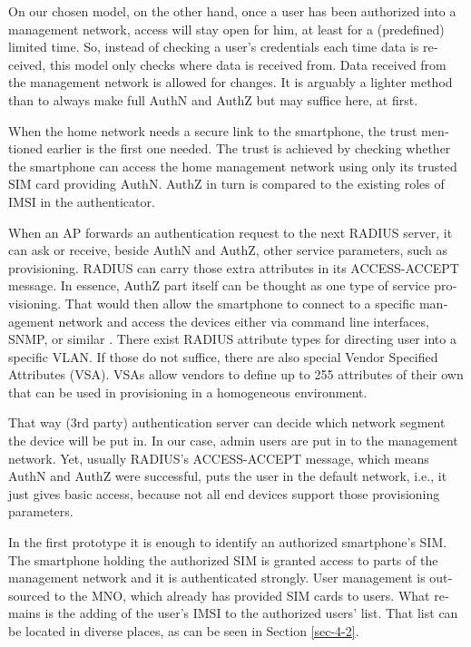 \documentclass[12pt,a4paper,english]{tutthesis}
\begin{document}
\begin{otherlanguage}{english}
On our chosen model, on the other hand, once a user has been authorized into a management network, access
will stay open for him, at least for a (predefined) limited time.
So, instead of checking a user's credentials each time data is received,
this model only checks where data is received from. 
Data received from the management network is allowed for changes.
It is arguably a lighter method than to always make 
full AuthN and AuthZ but may suffice here, at first.


When the home network needs a secure link to the smartphone, the trust
mentioned earlier is the first one needed.  The trust is achieved by
checking whether the smartphone can access the home management
network using only its trusted SIM card providing AuthN. AuthZ in
turn is compared to the existing roles of IMSI in the authenticator.




When an AP forwards an authentication request to the next RADIUS server, it
can ask or receive, beside AuthN and AuthZ, other service parameters,
such as provisioning. RADIUS can carry those extra attributes in its
ACCESS-ACCEPT message.  In essence, AuthZ part itself can be thought
as  one type of service provisioning.  That would then allow the
smartphone to connect to a specific management network and access the
devices either via command line interfaces, SNMP, or
similar \cite[p.4]{rfc5608}.
There exist RADIUS attribute types for directing user into a specific
VLAN. If those do not suffice, there are also special Vendor Specified
Attributes (VSA). VSAs allow vendors to define up to 255 
attributes of their own that can be used in provisioning in a homogeneous environment. 


That way (3rd party) authentication server can decide which network
segment the device will be put in.  In our case, admin users are put in
to the management network.  Yet, usually RADIUS's ACCESS-ACCEPT message,
which means AuthN and AuthZ were successful,  puts the user in
the default network, i.e., it just gives basic access, because 
not all end devices support those provisioning parameters.

In the first prototype it is enough to identify an authorized
smartphone's SIM.  The smartphone holding the authorized SIM is granted access to
 parts of the management network and it is authenticated strongly.  User
management is outsourced to the MNO, which
already has provided SIM cards to users. What remains is the adding
of the user's IMSI to the authorized users' list. That list can be
located in diverse places, as can be seen in Section \ref{sec-4-2}.



\end{otherlanguage}
\end{document}
